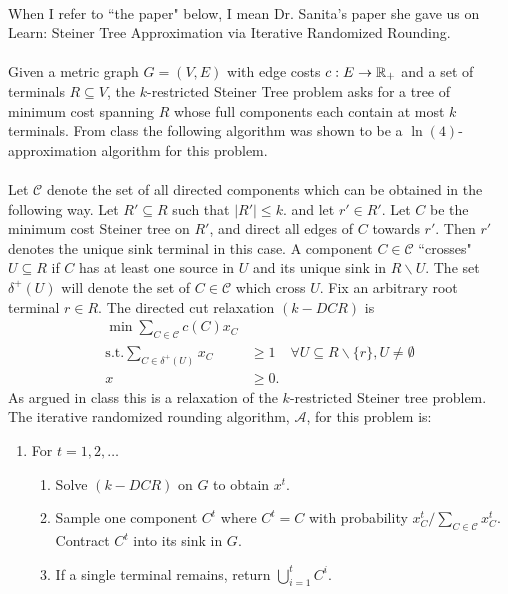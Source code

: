 \documentclass[letterpaper,12pt,oneside,onecolumn]{article}
\newcommand{\cA}{\mathcal{A}} \newcommand{\cB}{\mathcal{B}}
\newcommand{\cC}{\mathcal{C}} \newcommand{\cD}{\mathcal{D}}
\begin{document}
\paragraph{}
When I refer to ``the paper" below, I mean Dr. Sanita's paper she gave us on Learn: Steiner Tree Approximation via Iterative Randomized Rounding.
\paragraph{}
Given a metric graph $G=(V,E)$ with edge costs $c:E\rightarrow \mathbb{R}_+$ and a set of terminals $R\subseteq V$, the $k$-restricted Steiner Tree problem asks for a tree of minimum cost spanning $R$ whose full components each contain at most $k$ terminals. From class the following algorithm was shown to be a $\ln(4)$-approximation algorithm for this problem.
\paragraph{}
Let $\cC$ denote the set of all directed components which can be obtained in the following way. Let $R' \subseteq R$ such that $|R'| \leq k$. and let $r' \in R'$. Let $C$ be the minimum cost Steiner tree on $R'$, and direct all edges of $C$ towards $r'$. Then $r'$ denotes the unique sink terminal in this case. A component $C \in \cC$ ``crosses" $U\subseteq R$ if $C$ has at least one source in $U$ and its unique sink in $R\backslash U$. The set $\delta^+(U)$ will denote the set of $C \in \cC$ which cross $U$. Fix an arbitrary root terminal $r \in R$. The directed cut relaxation $(k-DCR)$ is
\begin{align*}
\min \sum_{C\in \cC} c(C)x_C& \\
\text{s.t.} \sum_{C\in\delta^+(U)} x_C &\geq 1 &\forall U\subseteq R\backslash \{r\}, U\neq \emptyset \\
x&\geq 0.
\end{align*}
As argued in class this is a relaxation of the $k$-restricted Steiner tree problem. The iterative randomized rounding algorithm, $\cA$, for this problem is:
\begin{enumerate}
\item For $t =1,2,\dots$
\begin{enumerate}
\item Solve $(k-DCR)$ on $G$ to obtain $x^t$.
\item Sample one component $C^t$ where $C^t=C$ with probability $x^t_C/\sum_{C\in\cC} x^t_C$. Contract $C^t$ into its sink in $G$.
\item If a single terminal remains, return $\bigcup_{i=1}^t C^i$.
\end{enumerate}
\end{enumerate}
\end{document}
